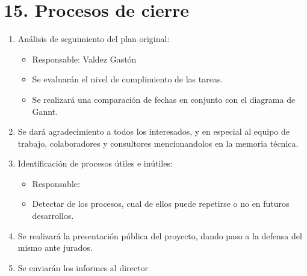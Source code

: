 \documentclass[
11pt, %
]{charter}
\begin{document}
\section{15. Procesos de cierre}    
\label{sec:cierre}
\begin{enumerate}
	\item Análisis de seguimiento del plan original: 
	\begin{itemize}
		\item Responsable: Valdez Gastón
		\item Se evaluarán el nivel de cumplimiento de las tareas.
		\item Se realizará una comparación de fechas en conjunto con el diagrama de Gannt. 

	\end{itemize}
	\item Se dará agradecimiento a todos los interesados, y en especial al equipo de trabajo, colaboradores y consultores mencionandolos en la memoria técnica.
	\item Identificación de procesos útiles e inútiles: 
	\begin{itemize}
		\item Responsable: \supname 
		\item Detectar de los procesos, cual de ellos puede repetirse o no en futuros desarrollos.
	\end{itemize}
	\item Se realizará la presentación pública del proyecto, dando paso a la defensa del mismo ante
jurados.
	\item Se enviarán los informes al director 

\end{enumerate}
\end{document}
